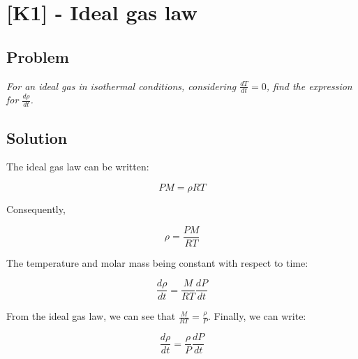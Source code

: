\section{[K1] - Ideal gas law}
\label{prob101}

\subsection{Problem}
\textit{For an ideal gas in isothermal conditions, considering $\frac{dT}{dt} = 0$, find the expression for $\frac{d\rho}{dt}$.} 

\subsection{Solution}

The ideal gas law can be written:

\begin{equation}
PM = \rho RT
\end{equation}

Consequently,


\begin{equation}
\rho = \frac{PM}{RT}
\end{equation}

The temperature and molar mass being constant with respect to time:

\begin{equation}
\frac{d\rho}{dt} = \frac{M}{RT}\frac{dP}{dt}
\end{equation}

From the ideal gas law, we can see that $\frac{M}{RT} = \frac{\rho}{P}$. Finally, we can write:

\begin{equation}
\frac{d\rho}{dt} = \frac{\rho}{P}\frac{dP}{dt}
\end{equation}

